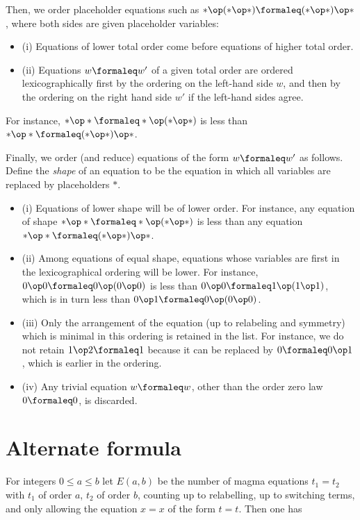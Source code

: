 Then, we order placeholder equations such as $\ast \op (\ast \op \ast) \formaleq (\ast \op \ast) \op \ast$, where both sides are given placeholder variables:
\begin{itemize}
\item (i)  Equations of lower total order come before equations of higher total order.
\item (ii) Equations $w \formaleq w'$ of a given total order are ordered lexicographically first by the ordering on the left-hand side $w$, and then by the ordering on the right hand side $w'$ if the left-hand sides agree.
\end{itemize}
For instance, $\ast \op \ast \formaleq \ast \op (\ast \op \ast)$ is less than $\ast \op \ast \formaleq (\ast \op \ast) \op \ast$.

Finally, we order (and reduce) equations of the form $w \formaleq w'$ as follows. Define the \emph{shape} of an equation to be the equation in which all variables are replaced by placeholders $\ast$.
\begin{itemize}
  \item (i) Equations of lower shape will be of lower order.  For instance, any equation of shape $\ast \op \ast \formaleq \ast \op (\ast \op \ast)$ is less than any equation $\ast \op \ast \formaleq (\ast \op \ast) \op \ast$.
  \item (ii) Among equations of equal shape, equations whose variables are first in the lexicographical ordering will be lower. For instance, $0 \op 0 \formaleq 0 \op (0 \op 0)$ is less than $0 \op 0 \formaleq 1 \op (1 \op 1)$, which is in turn less than $0 \op 1 \formaleq 0 \op (0 \op 0)$.
  \item (iii) Only the arrangement of the equation (up to relabeling and symmetry) which is minimal in this ordering is retained in the list.  For instance, we do not retain $1 \op 2 \formaleq 1$ because it can be replaced by $0 \formaleq 0 \op 1$, which is earlier in the ordering.
\item (iv) Any trivial equation $w \formaleq w$, other than the order zero law $0 \formaleq 0$, is discarded.
\end{itemize}

\section{Alternate formula}

For integers $0 \le a \le b$ let $E(a,b)$ be the number of magma equations $t_1 = t_2$ with $t_1$ of order $a$, $t_2$ of order $b$, counting up to relabelling, up to switching terms, and only allowing the equation $x=x$ of the form $t=t$.  Then one has

